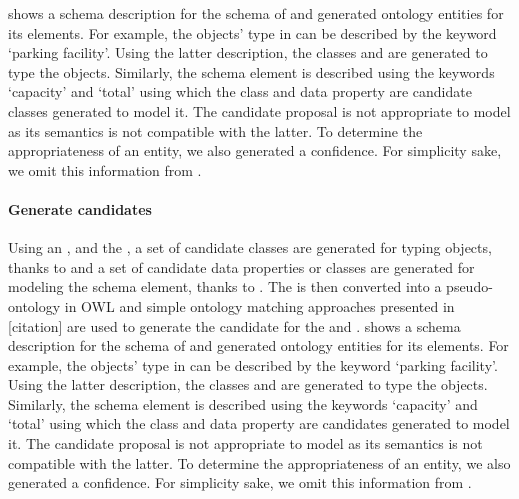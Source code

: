  shows a schema description for the schema of  and generated ontology entities for its elements. For example, the objects' type in  can be described by the keyword `parking facility'. Using the latter description, the classes  and  are generated to type the objects. Similarly, the schema element  is described using the keywords `capacity' and `total' using which the class  and data property  are candidate classes generated to model it. The candidate proposal  is not appropriate to model  as its semantics is not compatible with the latter. To determine the appropriateness of an entity, we also generated a confidence. For simplicity sake, we omit this information from .

\paragraph{Generate candidates}
Using an , and the , a set of candidate classes are generated for typing objects, thanks to  and a set of candidate data properties or classes are generated for modeling the schema element, thanks to .
The  is then converted into a pseudo-ontology in OWL and simple ontology matching approaches presented in [citation] are used to generate the candidate for the  and .
 shows a schema description for the schema of  and generated ontology entities for its elements. For example, the objects' type in  can be described by the keyword `parking facility'. Using the latter description, the classes  and  are generated to type the objects. Similarly, the schema element  is described using the keywords `capacity' and `total' using which the class  and data property  are candidates generated to model it. The candidate proposal  is not appropriate to model  as its semantics is not compatible with the latter. To determine the appropriateness of an entity, we also generated a confidence. For simplicity sake, we omit this information from .



